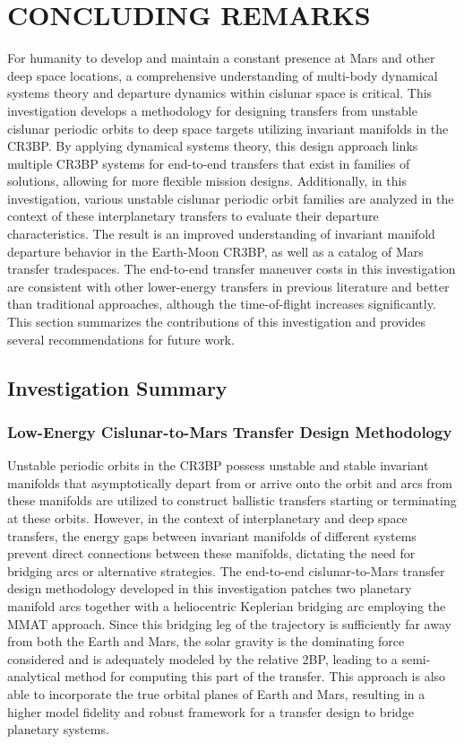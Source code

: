\chapter{CONCLUDING REMARKS}
For humanity to develop and maintain a constant presence at Mars and other deep space locations, a
comprehensive understanding of multi-body dynamical systems theory and departure dynamics within
cislunar space is critical. This investigation develops a methodology for designing transfers from
unstable cislunar periodic orbits to deep space targets utilizing invariant manifolds in the CR3BP.
By applying dynamical systems theory, this design approach links multiple CR3BP systems for
end-to-end transfers that exist in families of solutions, allowing for more flexible mission
designs. Additionally, in this investigation, various unstable cislunar periodic orbit families are
analyzed in the context of these interplanetary transfers to evaluate their departure
characteristics. The result is an improved understanding of invariant manifold departure behavior
in the Earth-Moon CR3BP, as well as a catalog of Mars transfer tradespaces. The end-to-end transfer
maneuver costs in this investigation are consistent with other lower-energy transfers in previous
literature and better than traditional approaches, although the time-of-flight increases
significantly. This section summarizes the contributions of this investigation and provides
several recommendations for future work.

\section{Investigation Summary}
\subsection{Low-Energy Cislunar-to-Mars Transfer Design Methodology}
Unstable periodic orbits in the CR3BP possess unstable and stable invariant manifolds that
asymptotically depart from or arrive onto the orbit and arcs from these manifolds are utilized to
construct ballistic transfers starting or terminating at these orbits. However, in the context of
interplanetary and deep space transfers, the energy gaps between invariant manifolds of different
systems prevent direct connections between these manifolds, dictating the need for bridging arcs
or alternative strategies. The end-to-end cislunar-to-Mars transfer design methodology developed in
this investigation patches two planetary manifold arcs together with a heliocentric Keplerian
bridging arc employing the MMAT approach. Since this bridging leg of the trajectory is sufficiently
far away from both the Earth and Mars, the solar gravity is the dominating force considered and is
adequately modeled by the relative 2BP, leading to a semi-analytical method for computing this part
of the transfer. This approach is also able to incorporate the true orbital planes of Earth and
Mars, resulting in a higher model fidelity and robust framework for a transfer design to bridge
planetary systems. 

